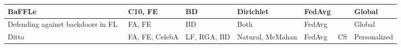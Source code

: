 \begin{table*}[]
\begin{tabular}{|l|p{2cm}|p{2.7cm}|l|p{1.5cm}|p{.7cm}|l|}
BaFFLe~\cite{andreina2021baffle}                                          & C10, FE              & BD                               & Dirichlet                  & FedAvg                &                  & Global              \\ \hline
Defending against backdoors in FL~\cite{ozdayi2021defending}               & FA, FE               & BD                               & Both                       & FedAvg                &                  & Global              \\ \hline
Ditto~\cite{li2021ditto}                                           & FA, FE, CelebA       & LF, RGA, BD                      & Natural, McMahan           & FedAvg                & CS               & Personalized        \\ \hline
\end{tabular}
\end{table*}